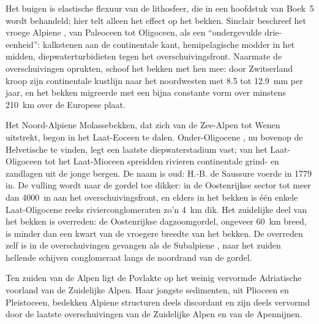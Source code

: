 Het buigen is elastische flexuur van de lithosfeer, die in een hoofdstuk van
Boek~5 wordt behandeld; hier telt alleen het effect op het bekken. Sinclair beschreef het vroege Alpiene , van Paleoceen tot Oligoceen,
als een ``ondergevulde drie-eenheid'': kalkstenen aan de continentale kant, hemipelagische modder in het
midden, diepwaterturbidieten tegen het overschuivingsfront. Naarmate de overschuivingen oprukten, schoof het bekken
met hen mee: door Zwitserland kroop zijn continentale kustlijn naar het noordwesten met 8.5
tot \qty{12.9}{mm} per jaar, en het bekken migreerde met een bijna constante vorm over minstens
\qty{210}{km} over de Europese plaat.

Het Noord-Alpiene Molassebekken, dat zich van de Zee-Alpen tot Wenen uitstrekt, begon in het
Laat-Eoceen te dalen. Onder-Oligocene , nu bovenop de Helvetische
 te vinden, legt een laatste diepwaterstadium vast; van het Laat-Oligoceen tot het Laat-Mioceen
spreidden rivieren continentale grind- en zandlagen uit de jonge bergen. De naam is oud: H.-B. de Saussure
voerde \emph{} in 1779 in. De vulling wordt naar de gordel toe dikker: in de
Oostenrijkse sector tot meer dan \qty{4000}{m} aan het overschuivingsfront, en elders in het bekken
is één enkele Laat-Oligocene reeks rivierconglomeraten zo'n \qty{4}{km} dik. Het zuidelijke deel van
het bekken is overreden: de Oostenrijkse dagzoomgordel, ongeveer \qty{60}{km} breed, is minder
dan een kwart van de vroegere breedte van het bekken. De overreden  zelf is in
de overschuivingen gevangen als de Subalpiene , naar het zuiden hellende schijven conglomeraat langs de
noordrand van de gordel.

Ten zuiden van de Alpen ligt de Povlakte op het weinig vervormde Adriatische voorland van de
Zuidelijke Alpen. Haar jongste sedimenten, uit Plioceen en Pleistoceen, bedekken Alpiene
structuren deels discordant en zijn deels vervormd door de laatste overschuivingen van de Zuidelijke Alpen
en van de Apennijnen.

